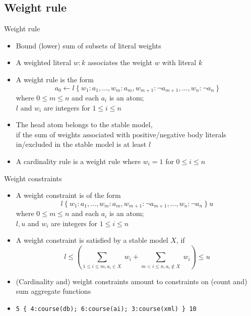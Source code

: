 \subsection{Weight rule}
\begin{frame}{Weight rule}
  \label{eqn:weight:rule}
  \begin{itemize}
  \item {} Bound (lower) sum of subsets of literal weights
  \item {} A \alert{weighted literal} $w:k$ associates the weight $w$ with literal $k$
  \item {} A \alert{weight rule} is the form
    \[
      a_0\leftarrow l~\{\ w_1:a_1,\dots,w_m:a_m,w_{m+1}:\neg a_{m+1},\dots,w_n:\neg a_n\ \}
    \]
    where $0\leq m\leq n$ and each $a_i$ is an atom;\\
    $l$ and $w_i$ are integers for $1\leq i\leq n$
    \medskip
  \item<2-> 
    The head atom belongs to the stable model,\\
    if the sum of weights associated with positive/negative body literals in/excluded in the stable model
    is at least $l$
    \medskip
  \item<3->  A cardinality rule is a weight rule where $w_i=1$  for $0\leq i\leq n$
  \end{itemize}
\end{frame}
\begin{frame}[fragile]{Weight constraints}
  \begin{itemize}
  \item {} A \alert{weight constraint} is of the form
    \[
    l~\{\ w_1:a_1,\dots,w_m:a_m,w_{m+1}:\neg a_{m+1},\dots,w_n:\neg a_n\ \}~u
    \]
    where $0\leq m\leq n$ and each $a_i$ is an atom;\\
    $l,u$ and $w_i$ are integers for $1\leq i\leq n$
    \smallskip
  \item<2->  A weight constraint is satisfied by a stable model $X$, if
    \[
    l\leq\left(
      \textstyle{\sum_{1\leq i\leq m, a_i    \in X}}\; w_i
      +
      \textstyle{\sum_{m <   i\leq n, a_i\not\in X}}\; w_i
    \right)\leq u
    \]
  \item<3->  (Cardinality and) weight constraints amount to constraints on (count and) sum aggregate functions
    \medskip
  \item<4-> 
\begin{lstlisting}[basicstyle=\ttfamily\small]
5 { 4:course(db); 6:course(ai); 3:course(xml) } 10
\end{lstlisting}
  \end{itemize}
\end{frame}
%
